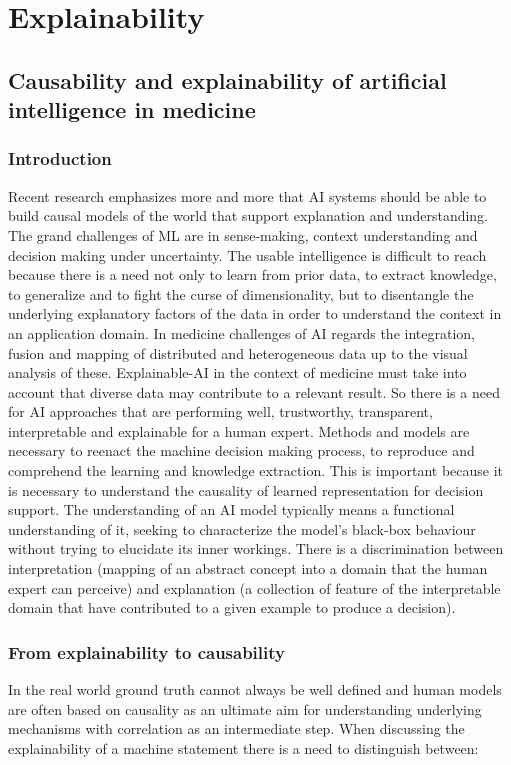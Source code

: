 \chapter{Explainability}

\section{Causability and explainability of artificial intelligence in medicine}

	\subsection{Introduction}
	Recent research emphasizes more and more that AI systems should be able to build causal models of the world that support explanation and understanding.
	The grand challenges of ML are in sense-making, context understanding and decision making under uncertainty.
	The usable intelligence is difficult to reach because there is a need not only to learn from prior data, to extract knowledge, to generalize and to fight the curse of dimensionality, but to disentangle the underlying explanatory factors of the data in order to understand the context in an application domain.
	In medicine challenges of AI regards the integration, fusion and mapping of distributed and heterogeneous data up to the visual analysis of these.
	Explainable-AI in the context of medicine must take into account that diverse data may contribute to a relevant result.
	So there is a need for AI approaches that are performing well, trustworthy, transparent, interpretable and explainable for a human expert.
	Methods and models are necessary to reenact the machine decision making process, to reproduce and comprehend the learning and knowledge extraction.
	This is important because it is necessary to understand the causality of learned representation for decision support.
	The understanding of an AI model typically means a functional understanding of it, seeking to characterize the model's black-box behaviour without trying to elucidate its inner workings.
	There is a discrimination between interpretation (mapping of an abstract concept into a domain that the human expert can perceive) and explanation (a collection of feature of the interpretable domain that have contributed to a given example to produce a decision).

	\subsection{From explainability to causability}
	In the real world ground truth cannot always be well defined and human models are often based on causality as an ultimate aim for understanding underlying mechanisms with correlation as an intermediate step.
	When discussing the explainability of a machine statement there is a need to distinguish between:

